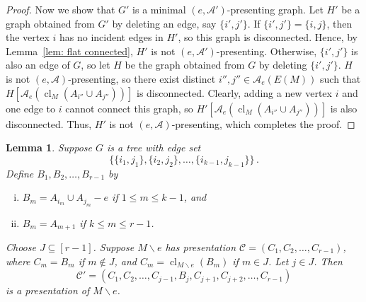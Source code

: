 \documentclass[11pt, reqno]{amsart}
\newtheorem{lemma}[theorem]{Lemma}
\DeclareMathOperator{\cl}{cl}
\begin{document}
\begin{proof}
Now we show that $G'$ is a minimal $(e, \mathcal A')$-presenting graph. 
Let $H'$ be a graph obtained from $G'$ by deleting an edge, say $\{i',j'\}$. If $\{i',j'\} = \{i,j\}$, then the vertex $i$ has no incident edges in $H'$, so this graph is disconnected. Hence, by Lemma~\ref{lem: flat connected}, $H'$ is not $(e, \mathcal A')$-presenting. Otherwise, $\{i',j'\}$ is also an edge of $G$, so let $H$ be the graph obtained from $G$ by deleting $\{i',j'\}$. $H$ is not $(e, \mathcal A)$-presenting, so there exist distinct $i'',j'' \in \mathcal A_e(E(M))$ such that $H[\mathcal A_e(\cl_M(A_{i''} \cup A_{j''}))]$ is disconnected. Clearly, adding a new vertex $i$ and one edge to $i$ cannot connect this graph, so $H'[\mathcal A_e(\cl_M(A_{i''} \cup A_{j''}))]$ is also disconnected. Thus, $H'$ is not $(e, \mathcal A)$-presenting, which completes the proof.
\end{proof}

\begin{lemma} \label{lem: simplify presentation}
Suppose $G$ is a tree with edge set
$$
\{\{i_1,j_1\},\{i_2,j_2\},\ldots,\{i_{k-1},j_{k-1}\}\} \,.
$$
Define $B_1, B_2, \ldots, B_{r-1}$ by 
\begin{enumerate} [(i)]
\item $B_m = A_{i_m} \cup A_{j_m} - e$ if $1 \leq m \leq k-1$, and 
\item $B_m = A_{m+1}$ if $k \leq m \leq r-1$. 
\end{enumerate}
Choose $J \subseteq [r-1]$. Suppose $M \backslash e$ has presentation $\mathcal C = (C_1, C_2, \ldots, C_{r-1})$, where $C_m = B_m$ if $m \notin J$, and $C_m = \cl_{M \backslash e}(B_m)$ if $m \in J$. Let $j \in J$. Then
$$
\mathcal C' = (C_1, C_2, \ldots, C_{j-1}, B_j, C_{j+1}, C_{j+2}, \ldots, C_{r-1})
$$
is a presentation of $M \backslash e$.
\end{lemma}
\end{document}
